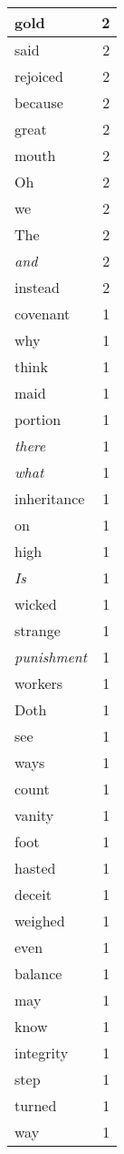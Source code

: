 \begin{center}
\begin{longtable}{l|r}
gold & 2 \\ \hline
said & 2 \\ \hline
rejoiced & 2 \\ \hline
because & 2 \\ \hline
great & 2 \\ \hline
mouth & 2 \\ \hline
Oh & 2 \\ \hline
we & 2 \\ \hline
The & 2 \\ \hline
\emph{and} & 2 \\ \hline
instead & 2 \\ \hline
covenant & 1 \\ \hline
why & 1 \\ \hline
think & 1 \\ \hline
maid & 1 \\ \hline
portion & 1 \\ \hline
\emph{there} & 1 \\ \hline
\emph{what} & 1 \\ \hline
inheritance & 1 \\ \hline
on & 1 \\ \hline
high & 1 \\ \hline
\emph{Is} & 1 \\ \hline
wicked & 1 \\ \hline
strange & 1 \\ \hline
\emph{punishment} & 1 \\ \hline
workers & 1 \\ \hline
Doth & 1 \\ \hline
see & 1 \\ \hline
ways & 1 \\ \hline
count & 1 \\ \hline
vanity & 1 \\ \hline
foot & 1 \\ \hline
hasted & 1 \\ \hline
deceit & 1 \\ \hline
weighed & 1 \\ \hline
even & 1 \\ \hline
balance & 1 \\ \hline
may & 1 \\ \hline
know & 1 \\ \hline
integrity & 1 \\ \hline
step & 1 \\ \hline
turned & 1 \\ \hline
way & 1 \\ \hline

\end{longtable}
\end{center}
